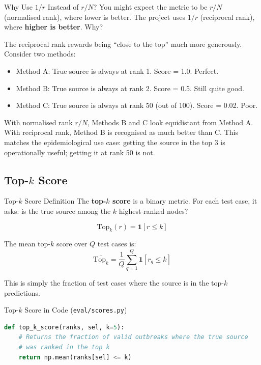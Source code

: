 \begin{analogybox}{Why Use $1/r$ Instead of $r/N$?}
You might expect the metric to be $r/N$ (normalised rank), where lower is better. The project uses $1/r$ (reciprocal rank), where \textbf{higher is better}. Why?

The reciprocal rank rewards being ``close to the top'' much more generously. Consider two methods:
\begin{itemize}
    \item Method A: True source is always at rank 1. Score = 1.0. Perfect.
    \item Method B: True source is always at rank 2. Score = 0.5. Still quite good.
    \item Method C: True source is always at rank 50 (out of 100). Score = 0.02. Poor.
\end{itemize}

With normalised rank $r/N$, Methods B and C look equidistant from Method A. With reciprocal rank, Method B is recognised as much better than C. This matches the epidemiological use case: getting the source in the top 3 is operationally useful; getting it at rank 50 is not.
\end{analogybox}

\subsection{Top-$k$ Score}

\begin{mathbox}{Top-$k$ Score Definition}
The \textbf{top-$k$ score} is a binary metric. For each test case, it asks: is the true source among the $k$ highest-ranked nodes?

\[
\text{Top}_k(r) = \mathbf{1}[r \leq k]
\]

The mean top-$k$ score over $Q$ test cases is:
\[
\overline{\text{Top}_k} = \frac{1}{Q} \sum_{q=1}^{Q} \mathbf{1}[r_q \leq k]
\]

This is simply the fraction of test cases where the source is in the top-$k$ predictions.
\end{mathbox}

\begin{codewalk}{Top-$k$ Score in Code (\texttt{eval/scores.py})}
\begin{lstlisting}[language=Python]
def top_k_score(ranks, sel, k=5):
    # Returns the fraction of valid outbreaks where the true source
    # was ranked in the top k
    return np.mean(ranks[sel] <= k)
\end{lstlisting}
\end{codewalk}


